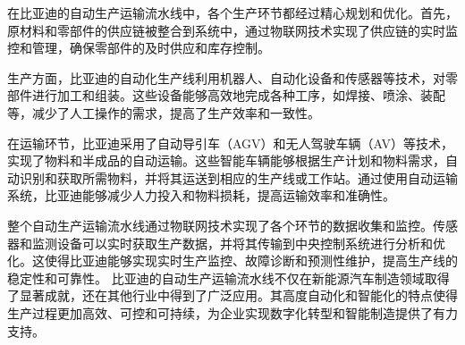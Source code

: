 在比亚迪的自动生产运输流水线中，各个生产环节都经过精心规划和优化。首先，原材料和零部件的供应链被整合到系统中，通过物联网技术实现了供应链的实时监控和管理，确保零部件的及时供应和库存控制。

生产方面，比亚迪的自动化生产线利用机器人、自动化设备和传感器等技术，对零部件进行加工和组装。这些设备能够高效地完成各种工序，如焊接、喷涂、装配等，减少了人工操作的需求，提高了生产效率和一致性。

在运输环节，比亚迪采用了自动导引车（AGV）和无人驾驶车辆（AV）等技术，实现了物料和半成品的自动运输。这些智能车辆能够根据生产计划和物料需求，自动识别和获取所需物料，并将其运送到相应的生产线或工作站。通过使用自动运输系统，比亚迪能够减少人力投入和物料损耗，提高运输效率和准确性。

整个自动生产运输流水线通过物联网技术实现了各个环节的数据收集和监控。传感器和监测设备可以实时获取生产数据，并将其传输到中央控制系统进行分析和优化。这使得比亚迪能够实现实时生产监控、故障诊断和预测性维护，提高生产线的稳定性和可靠性。
比亚迪的自动生产运输流水线不仅在新能源汽车制造领域取得了显著成就，还在其他行业中得到了广泛应用。其高度自动化和智能化的特点使得生产过程更加高效、可控和可持续，为企业实现数字化转型和智能制造提供了有力支持。



